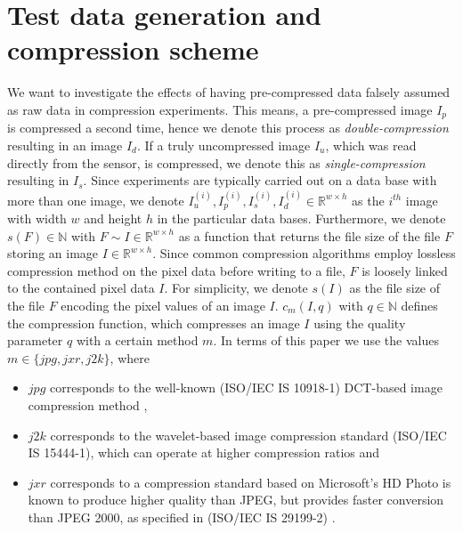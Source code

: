 \documentclass[10pt,twocolumn,letterpaper]{article}
\begin{document}
\section{Test data generation and compression scheme}
\label{section:comprScheme}
We want to investigate the effects of having pre-compressed data falsely assumed as raw data in compression experiments. This means, a pre-compressed image $I_p$ is compressed a second time, hence we denote this process as \emph{double-compression} resulting in an image $I_d$. If a truly uncompressed image $I_u$, which was read directly from the sensor, is compressed, we denote this as \emph{single-compression} resulting in $I_s$. Since experiments are typically carried out on a data base with more than one image, we denote $I_u^{(i)}, I_p^{(i)}, I_s^{(i)}, I_d^{(i)} \in \mathbb{R}^{w \times h}$ as the $i^{th}$ image with width $w$ and height $h$ in the particular data bases. Furthermore, we denote $s(F) \in \mathbb{N}$ with $F \sim{I \in \mathbb{R}^{w \times h}}$ as a function that returns the file size of the file $F$ storing an image $I \in \mathbb{R}^{w \times h} $. Since common compression algorithms employ lossless compression method on the pixel data before writing to a file, $F$ is loosely linked to the contained pixel data $I$. For simplicity, we denote $s(I)$ as the file size of the file $F$ encoding the pixel values of an image $I$. $c_{m}(I, q)$ with $q \in \mathbb{N}$ defines the compression function, which compresses an image $I$ using the quality parameter $q$ with a certain method $m$. In terms of this paper we use the values $m \in \{jpg, jxr, j2k\}$, where 
\begin{itemize}
	\item $jpg$ corresponds to the well-known (ISO/IEC IS 10918-1) DCT-based image compression method \cite{jpg},
	\item $j2k$ corresponds to the wavelet-based image compression standard (ISO/IEC IS 15444-1), which can operate at higher compression ratios \cite{j2k} and
	\item $jxr$ corresponds to a compression standard based on Microsoft’s HD Photo is known to produce higher quality than JPEG, but provides faster conversion than JPEG 2000, as specified in (ISO/IEC IS 29199-2) \cite{jxr}.  
\end{itemize}

\end{document}
